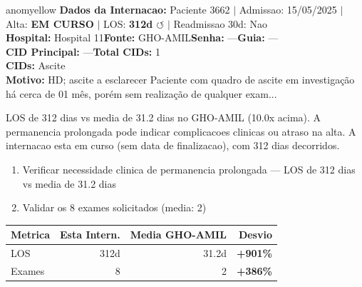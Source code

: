 \documentclass[a4paper,10pt]{article}
\begin{document}
\begin{anomalycard}[Internacao 3737 | GHO-AMIL | MODERADO (z=2.45)]{anomyellow}
\textbf{Dados da Internacao:} Paciente 3662 $\mid$ Admissao: 15/05/2025 $\mid$ Alta: \textcolor{anomorange}{\textbf{EM CURSO}} $\mid$ LOS: \textbf{312d \textcolor{anomorange}{$\circlearrowleft$}} $\mid$ Readmissao 30d: Nao\\
\textbf{Hospital:} Hospital 11\quad\textbf{Fonte:} GHO-AMIL\quad\textbf{Senha:} ---\quad\textbf{Guia:} ---\\
\textbf{CID Principal:} {\small ---}\quad\textbf{Total CIDs:} 1\\

\textbf{CIDs:} {\scriptsize Ascite}\\

\textbf{Motivo:} {\scriptsize HD; ascite a esclarecer  Paciente com quadro de ascite em investigação há cerca de 01 mês, porém sem realização de qualquer exam...}\\

\vspace{2pt}\begin{tcolorbox}[colback=severityred!20,colframe=anomyellow,title={\textbf{Interpretacao de Negocio}},fonttitle=\bfseries\small,left=4pt,right=4pt,top=3pt,bottom=3pt]
{\small LOS de 312 dias vs media de 31.2 dias no GHO-AMIL (10.0x acima). A permanencia prolongada pode indicar complicacoes clinicas ou atraso na alta. A internacao esta em curso (sem data de finalizacao), com 312 dias decorridos.}
\end{tcolorbox}
\begin{tcolorbox}[colback=severityyellow!30,colframe=anomorange,title={\textbf{Recomendacoes Especificas}},fonttitle=\bfseries\small,left=4pt,right=4pt,top=3pt,bottom=3pt]
\begin{enumerate}[nosep,leftmargin=16pt]
\item {\small Verificar necessidade clinica de permanencia prolongada --- LOS de 312 dias vs media de 31.2 dias}
\item {\small Validar os 8 exames solicitados (media: 2)}
\end{enumerate}
\end{tcolorbox}
\begin{center}\begin{tabular}{l r r r}\toprule\textbf{Metrica} & \textbf{Esta Intern.} & \textbf{Media GHO-AMIL} & \textbf{Desvio} \\\midrule
LOS & 312d & 31.2d & \textcolor{anomred}{\textbf{+901\%}} \\
Exames & 8 & 2 & \textcolor{anomred}{\textbf{+386\%}} \\
\bottomrule\end{tabular}\end{center}


\end{anomalycard}
\end{document}
